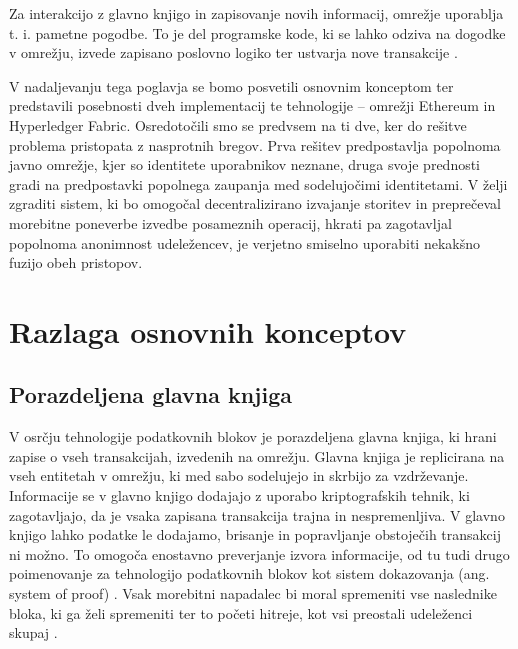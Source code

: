 \documentclass[a4paper, 12pt]{book}
\begin{document}
Za interakcijo z glavno knjigo in zapisovanje novih informacij, omrežje uporablja t. i. pametne pogodbe.
To je del programske kode, ki se lahko odziva na dogodke v omrežju, izvede zapisano poslovno logiko ter ustvarja nove transakcije \cite{hyperledgerDocs}.

V nadaljevanju tega poglavja se bomo posvetili osnovnim konceptom ter predstavili posebnosti dveh implementacij te tehnologije -- omrežji Ethereum in Hyperledger Fabric.
Osredotočili smo se predvsem na ti dve, ker do rešitve problema pristopata z nasprotnih bregov.
Prva rešitev predpostavlja popolnoma javno omrežje, kjer so identitete uporabnikov neznane, druga svoje prednosti gradi na predpostavki popolnega zaupanja med sodelujočimi identitetami.
V želji zgraditi sistem, ki bo omogočal decentralizirano izvajanje storitev in preprečeval morebitne poneverbe izvedbe posameznih operacij, hkrati pa zagotavljal popolnoma anonimnost udeležencev, je verjetno smiselno uporabiti nekakšno fuzijo obeh pristopov.

\section{Razlaga osnovnih konceptov}

\subsection{Porazdeljena glavna knjiga}
V osrčju tehnologije podatkovnih blokov je porazdeljena glavna knjiga, ki hrani zapise o vseh transakcijah, izvedenih na omrežju.
Glavna knjiga je replicirana na vseh entitetah v omrežju, ki med sabo sodelujejo in skrbijo za vzdrževanje.
Informacije se v glavno knjigo dodajajo z uporabo kriptografskih tehnik, ki zagotavljajo, da je vsaka zapisana transakcija trajna in nespremenljiva.
V glavno knjigo lahko podatke le dodajamo, brisanje in popravljanje obstoječih transakcij ni možno.
To omogoča enostavno preverjanje izvora informacije, od tu tudi drugo poimenovanje za tehnologijo podatkovnih blokov kot sistem dokazovanja (ang. system of proof) \cite{hyperledgerDocs}.
Vsak morebitni napadalec bi moral spremeniti vse naslednike bloka, ki ga želi spremeniti ter to početi hitreje, kot vsi preostali udeleženci skupaj \cite{hampton2016understanding}.
\end{document}

